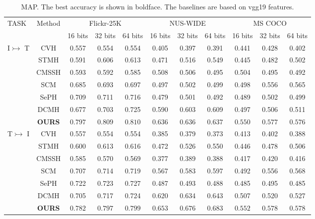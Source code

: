 \documentclass[10pt,twocolumn,letterpaper]{article}
\begin{document}
\begin{table*}[!t]
	\begin{center}
		\caption{MAP. The best accuracy is shown in boldface. The baselines are based on vgg19 features.}
		\vspace{-0.3cm}
		\label{resultVgg:Flickr-NUS-CoCo}
		\begin{tabular}{|l|c|c|c|c|c|c|c|c|c|c|}
			\hline
			\multirow{2}{*}{TASK} & \multirow{2}{*}{Method} &\multicolumn{3}{c|}{Flickr-25K} & \multicolumn{3}{c|}{NUS-WIDE}& \multicolumn{3}{c|}{MS COCO}\\
			\cline{3-11}
			& & 16 bits& 32 bits& 64 bits& 16 bits& 32 bits& 64 bits& 16 bits& 32 bits & 64 bits\\
			\hline
			\multirow{7}{*}{I$\rightarrowtail$ T}
			& CVH \cite{Kumar2011Learning} & 0.557 & 0.554 & 0.554 & 0.405 & 0.397 & 0.391 & 0.441 & 0.428 & 0.402\\
			& STMH \cite{Wang2015Semantic}   & 0.591 & 0.606 & 0.613 & 0.471 & 0.516 & 0.549 & 0.445 & 0.482 & 0.502\\
			& CMSSH \cite{Bronstein2010Data} & 0.593 & 0.592 & 0.585 & 0.508 & 0.506 & 0.495 & 0.504 & 0.495 & 0.492\\
			& SCM  \cite{Zhang2014Large}     & 0.685 & 0.693 & 0.697 & 0.497 & 0.502 & 0.499 & 0.498 & 0.556 & 0.565\\
			& SePH \cite{Lin2015CVPR}        & 0.709 & 0.711 & 0.716 & 0.479 & 0.501 & 0.492 & 0.489 & 0.502 & 0.499\\
			& DCMH \cite{Jiang2017CVPR}      & 0.677 & 0.703 & 0.725 & 0.590 & 0.603 & 0.609 & 0.497 & 0.506 & 0.511\\
			& \textbf{OURS} & $\mathbf{0.797}$ & $\mathbf{0.809}$ & $\mathbf{0.810}$ & $\mathbf{0.636}$ & $\mathbf{0.636}$ & $\mathbf{0.637}$ & $\mathbf{0.550}$ & $\mathbf{0.577}$ & $\mathbf{0.576}$\\
			\hline
			\multirow{7}{*}{T$\rightarrowtail$ I}
			& CVH \cite{Kumar2011Learning} & 0.557 & 0.554 & 0.554 & 0.385 & 0.379 & 0.373 & 0.413 & 0.402 & 0.388\\
			& STMH \cite{Wang2015Semantic}   & 0.600 & 0.613 & 0.616 & 0.472 & 0.526 & 0.550 & 0.446 & 0.478 & 0.506\\
			& CMSSH \cite{Bronstein2010Data} & 0.585 & 0.570 & 0.569 & 0.377 & 0.389 & 0.388 & 0.417 & 0.420 & 0.416\\
			& SCM  \cite{Zhang2014Large}     & 0.707 & 0.714 & 0.719 & 0.567 & 0.583 & 0.597 & 0.492 & 0.556 & 0.568\\
			& SePH \cite{Lin2015CVPR}        & 0.722 & 0.723 & 0.727 & 0.487 & 0.493 & 0.488 & 0.485 & 0.495 & 0.485\\
			& DCMH \cite{Jiang2017CVPR}      & 0.705 & 0.717 & 0.724 & 0.620 & 0.634 & 0.643 & 0.507 & 0.520 & 0.527\\
			& \textbf{OURS} & $\mathbf{0.782}$ & $\mathbf{0.797}$ & $\mathbf{0.799}$ & $\mathbf{0.653}$ & $\mathbf{0.676}$ & $\mathbf{0.683}$ & $\mathbf{0.552}$ & $\mathbf{0.578}$ & $\mathbf{0.578}$\\
			\hline
		\end{tabular}
	\end{center}
	\vspace{-0.5cm}
\end{table*}
\end{document}
